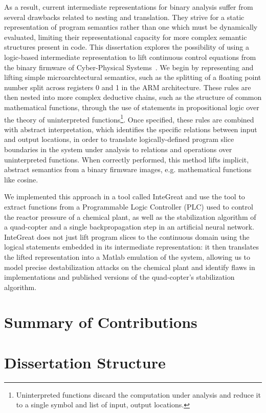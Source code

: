 As a result, current intermediate representations for binary analysis suffer from several drawbacks related to nesting and translation.
They strive for a static representation of program semantics rather than one which must be dynamically evaluated, limiting their representational capacity for more complex semantic structures present in code.
This dissertation explores the possibility of using a logic-based intermediate representation to lift continuous control equations from the binary firmware of Cyber-Physical Systems~\cite{letichevsky2017cyber}.
We begin by representing and lifting simple microarchtectural semantics, such as the splitting of a floating point number split across registers 0 and 1 in the ARM architecture.
These rules are then nested into more complex deductive chains, such as the structure of common mathematical functions, through the use of statements in propositional logic over the theory of uninterpreted functions\footnote{Uninterpreted functions discard the computation under analysis and reduce it to a single symbol and list of input, output locations.}.
Once specified, these rules are combined with abstract interpretation, which identifies the specific relations between input and output locations, in order to translate logically-defined program slice boundaries in the system under analysis to relations and operations over uninterpreted functions.
When correctly performed, this method lifts implicit, abstract semantics from a binary firmware images, e.g. mathematical functions like cosine.

We implemented this approach in a tool called InteGreat and use the tool to extract functions from a Programmable Logic Controller (PLC) used to control the reactor pressure of a chemical plant, as well as the stabilization algorithm of a quad-copter and a single backpropagation step in an artificial neural network.
InteGreat does not just lift program slices to the continuous domain using the logical statements embedded in its intermediate representation: it then translates the lifted representation into a Matlab emulation of the system, allowing us to model precise destabilization attacks on the chemical plant and identify flaws in implementations and published versions of the quad-copter's stabilization algorithm.

\section{Summary of Contributions}

\section{Dissertation Structure}
